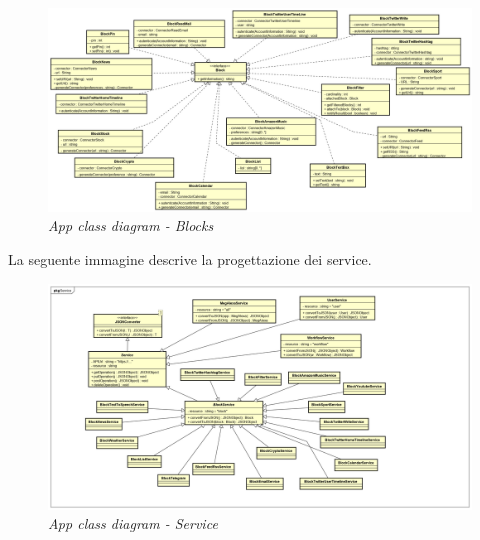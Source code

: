 \begin{figure} [H]
	\centering
	\includegraphics[scale=0.3]{./images/Blocks.png}
	\caption{\textit{App class diagram - Blocks}}\label{Blocks}
\end{figure}

La seguente immagine descrive la progettazione dei service.
\begin{figure} [H]
	\centering
	\includegraphics[scale=0.3]{./images/Service.png}
	\caption{\textit{App class diagram - Service}}\label{Service}
\end{figure}

